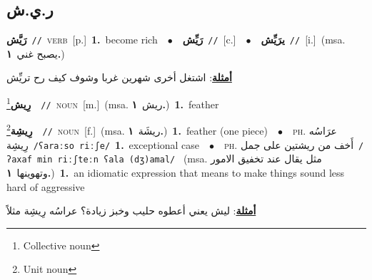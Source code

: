 \documentclass[10pt,a4paper,twoside]{article} %
\begin{document}
\begin{multicols}{2}
\vspace{-3mm}
\subsection*{\color{blue}\foreignlanguage{arabic}{ر.ي.ش}\color{blue}{}} 

{\setlength\topsep{0pt}\textbf{\foreignlanguage{arabic}{رَيَّش}}\ {\color{gray}\texttt{//}\color{black}}\ \textsc{verb}\ [p.]\ \textbf{1.}~become rich\ \ $\bullet$\ \ \setlength\topsep{0pt}\textbf{\foreignlanguage{arabic}{رَيِّش}}\ {\color{gray}\texttt{//}\color{black}}\ [c.]\ \ $\bullet$\ \ \setlength\topsep{0pt}\textbf{\foreignlanguage{arabic}{يرَيِّش}}\ {\color{gray}\texttt{//}\color{black}}\ [i.]\ \color{gray}(msa. \foreignlanguage{arabic}{يصبح غني}~\foreignlanguage{arabic}{\textbf{١.}})\color{black}\  \begin{flushright}\color{gray}\foreignlanguage{arabic}{\textbf{\underline{\foreignlanguage{arabic}{أمثلة}}}: اشتغل أخرى شهرين غربا وشوف كيف رح تريِّش}\end{flushright}\color{black}} \vspace{2mm}

{\setlength\topsep{0pt}\textbf{\foreignlanguage{arabic}{رِيش}}\footnote{Collective noun}\ \ {\color{gray}\texttt{//}\color{black}}\ \textsc{noun}\ [m.]\ \color{gray}(msa. \foreignlanguage{arabic}{ريش}~\foreignlanguage{arabic}{\textbf{١.}})\color{black}\ \textbf{1.}~feather\ } \vspace{2mm}

{\setlength\topsep{0pt}\textbf{\foreignlanguage{arabic}{رِيشِة}}\footnote{Unit noun}\ \ {\color{gray}\texttt{//}\color{black}}\ \textsc{noun}\ [f.]\ \color{gray}(msa. \foreignlanguage{arabic}{ريشَة}~\foreignlanguage{arabic}{\textbf{١.}})\color{black}\ \textbf{1.}~feather (one piece)\ \ $\bullet$\ \ \textsc{ph.} \color{gray} \foreignlanguage{arabic}{عرَاسُه رِيشِة}\color{black}\ {\color{gray}\texttt{/{\sffamily ʕaraːso riːʃe}/}\color{black}}\ \textbf{1.}~exceptional case\ \ $\bullet$\ \ \textsc{ph.} \color{gray} \foreignlanguage{arabic}{أَخف من ريشتين على جمل}\color{black}\ {\color{gray}\texttt{/{\sffamily ʔaxaf min riːʃteːn ʕala (dʒ)amal}/}\color{black}}\ \color{gray} (msa. \foreignlanguage{arabic}{مثل يقال عند تخفيق الامور وتهوينها}~\foreignlanguage{arabic}{\textbf{١.}})\color{black}\ \textbf{1.}~an idiomatic expression that means to make things sound less hard of aggressive\  \begin{flushright}\color{gray}\foreignlanguage{arabic}{\textbf{\underline{\foreignlanguage{arabic}{أمثلة}}}: ليش يعني أعطوه حليب وخبز زيادة؟ عراسُه رِيشِة مثلاً}\end{flushright}\color{black}} \vspace{2mm}


\end{multicols}
\end{document}
